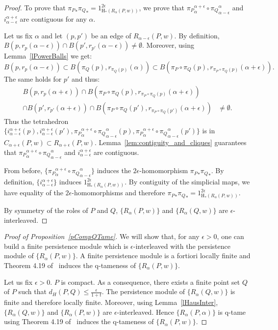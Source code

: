 \documentclass[a4paper]{article}
\newcommand{\Hom}{\mathrm{H_*}}
\begin{document}
\begin{proof}
To prove that ${\pi_P}_*{\pi_Q}_*=1_{\Hom(R_\alpha(P,w))}^{2\epsilon}$, we prove that ${\pi_P}_\alpha^{\alpha+\epsilon}\circ{\pi_Q}_{\alpha-\epsilon}^\alpha$ and $i_{\alpha-\epsilon}^{\alpha+\epsilon}$ are contiguous for any $\alpha$.

Let us fix $\alpha$ and let $(p,p')$ be an edge of $R_{\alpha-\epsilon}(P,w)$.
By definition, $B(p,r_p(\alpha-\epsilon))\cap B(p',r_{p'}(\alpha-\epsilon))\neq\emptyset$.
Moreover, using Lemma~\ref{lPowerBalls} we get:
$$B(p,r_p(\alpha-\epsilon))\subset B(\pi_Q(p),r_{\pi_Q(p)}(\alpha))\subset B(\pi_P\circ\pi_Q(p),r_{\pi_P\circ\pi_Q(p)}(\alpha+\epsilon)).$$
The same holds for $p'$ and thus:
\begin{align*}
B(p,r_p(\alpha+\epsilon))\cap B(\pi_P\circ\pi_Q(p),r_{\pi_P\circ\pi_Q(p)}(\alpha+\epsilon))&\\
\cap B(p',r_{p'}(\alpha+\epsilon))\cap B(\pi_P\circ\pi_Q(p'),r_{\pi_P\circ\pi_Q(p')}(\alpha+\epsilon)) & \neq\emptyset.
\end{align*}
Thus the tetrahedron $\{i_{\alpha-\epsilon}^{\alpha+\epsilon}(p),i_{\alpha-\epsilon}^{\alpha+\epsilon}(p'),{\pi_P}_\alpha^{\alpha+\epsilon}\circ{\pi_Q}_{\alpha-\epsilon}^\alpha(p),{\pi_P}_\alpha^{\alpha+\epsilon}\circ{\pi_Q}_{\alpha-\epsilon}^\alpha(p')\}$ is in $C_{\alpha+\epsilon}(P,w)\subset R_{\alpha+\epsilon}(P,w)$.
Lemma~\ref{lem:contiguity_and_cliques} guarantees that ${\pi_P}_\alpha^{\alpha+\epsilon}\circ{\pi_Q}_{\alpha-\epsilon}^\alpha$ and $i_{\alpha-\epsilon}^{\alpha+\epsilon}$ are contiguous.

From before, $\{{\pi_P}_{\alpha}^{\alpha+\epsilon}\circ{\pi_Q}_{\alpha-\epsilon}^{\alpha}\}$ induces the $2\epsilon$-homomorphism ${\pi_P}_*{\pi_Q}_*$.
By definition, $\{i_{\alpha-\epsilon}^{\alpha+\epsilon}\}$ induces $1_{\Hom(R_\alpha(P,w))}^{2\epsilon}$.
By contiguity of the simplicial maps, we have equality of the $2\epsilon$-homomorphisms and therefore ${\pi_P}_*{\pi_Q}_*=1_{\Hom(R_\alpha(P,w))}^{2\epsilon}$.

By symmetry of the roles of $P$ and $Q$, $\{R_\alpha(P,w)\}$ and $\{R_\alpha(Q,w)\}$ are $\epsilon$-interleaved.
\end{proof}

\begin{proof}[Proof of Proposition~\ref{pCompQTame}]
We will show that, for any $\epsilon>0$, one can build a finite persistence module which is $\epsilon$-interleaved with the persistence module of $\{R_\alpha(P,w)\}$.
A finite persistence module is a fortiori locally finite and Theorem 4.19 of~\cite{sspmCDGO} induces the q-tameness of $\{R_\alpha(P,w)\}$.

Let us fix $\epsilon>0$.
$P$ is compact.
As a consequence, there exists a finite point set $Q$ of $P$ such that $d_H(P,Q)\leq\frac{\epsilon}{1+t}$.
The persistence module of $\{R_\alpha(Q,w)\}$ is finite and therefore locally finite.
Moreover, using Lemma~\ref{lHausInter}, $\{R_\alpha(Q,w)\}$ and $\{R_\alpha(P,w)\}$ are $\epsilon$-interleaved.
Hence $\{R_\alpha(P,\alpha)\}$ is q-tame using Theorem 4.19 of~\cite{sspmCDGO} induces the q-tameness of $\{R_\alpha(P,w)\}$.
\end{proof}
\end{document}
